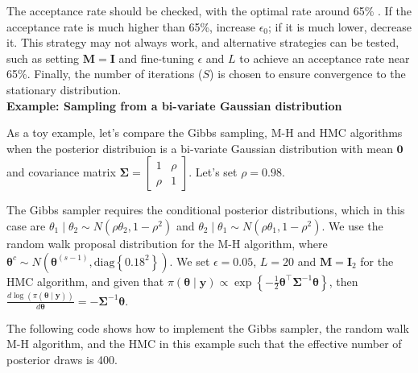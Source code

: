 The acceptance rate should be checked, with the optimal rate around 65\% \cite[Chap.~12]{gelman2021bayesian}. If the acceptance rate is much higher than 65\%, increase \(\epsilon_0\); if it is much lower, decrease it. This strategy may not always work, and alternative strategies can be tested, such as setting \(\bm{M} = \bm{I}\) and fine-tuning \(\epsilon\) and \(L\) to achieve an acceptance rate near 65\%. Finally, the number of iterations (\(S\)) is chosen to ensure convergence to the stationary distribution.\\

\textbf{Example: Sampling from a bi-variate Gaussian distribution}

As a toy example, let's compare the Gibbs sampling, M-H and HMC algorithms when the posterior distribuion is a bi-variate Gaussian distribution with mean $\bm{0}$ and covariance matrix $\bm{\Sigma}=\begin{bmatrix}
	1 & \rho \\
	\rho & 1
\end{bmatrix}$. Let's set $\rho= 0.98$.

The Gibbs sampler requires the conditional posterior distributions, which in this case are $\theta_1\mid \theta_2\sim N(\rho\theta_2,1-\rho^2)$ and $\theta_2\mid \theta_1\sim N(\rho\theta_1,1-\rho^2)$. We use the random walk proposal distribution for the M-H algorithm, where $\bm{\theta}^c\sim N(\bm{\theta}^{(s-1)}, \text{diag}\left\{0.18^2\right\})$. We set $\epsilon=0.05$, $L=20$ and $\bm{M}=\bm{I}_2$ for the HMC algorithm, and given that $\pi(\bm{\theta}\mid \bm{y})\propto \exp\left\{-\frac{1}{2}\bm{\theta}^{\top}\bm{\Sigma}^{-1}\bm{\theta}\right\}$, then $\frac{d\log(\pi(\bm{\theta}\mid \bm{y}))}{d\bm{\theta}}=-\bm{\Sigma}^{-1}\bm{\theta}$.

The following code shows how to implement the Gibbs sampler, the random walk M-H algorithm, and the HMC in this example such that the effective number of posterior draws is 400.

